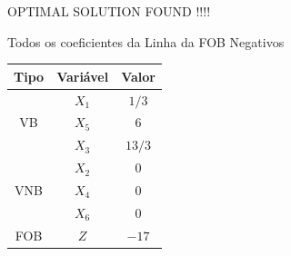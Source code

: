 \begin{frame}
{\begin{table}
\begin{tabular}{c c c c c c c c c c c c}
			\end{tabular}
		\end{table}
		{
			\begin{mdframed}[backgroundcolor=red!80]
				\centering
				OPTIMAL SOLUTION FOUND !!!!
			\end{mdframed}
			\vspace{0.2cm}
			\centering
			\Large
			Todos os coeficientes da Linha da FOB Negativos
		}
	}	
	{
		\begin{table}
			\begin{tabular}{ c | c | c |}
				\hline
				\cellcolor{blue!100} \color{white}\scriptsize Tipo     & 
				\cellcolor{blue!100} \color{white} \scriptsize Variável &  
				\cellcolor{blue!100} \color{white} \scriptsize Valor \\
				\hline
				\cellcolor{green!100} \multirow{3}{1cm}{VB}  & 
				\cellcolor{green!100} $\scriptstyle X_1$   &  
				\cellcolor{green!100} $\scriptstyle 1/3$   \\
				\cellcolor{green!100} VB & \cellcolor{green!100} $\scriptstyle X_5$   &  
				\cellcolor{green!100} $\scriptstyle 6$   \\
				\cellcolor{green!100} & \cellcolor{green!100} $\scriptstyle X_3$   &  
				\cellcolor{green!100} $\scriptstyle 13/3$   \\
				\multirow{3}{1cm}{ VNB} & $\scriptstyle X_2$   &  $\scriptstyle 0$   \\
										& $\scriptstyle X_4$   &  $\scriptstyle 0$   \\
										& $\scriptstyle X_6$   &  $\scriptstyle 0$ \\
				\cellcolor{green!100}FOB 				 & 
				\cellcolor{green!100} $\scriptstyle Z$     &  
				\cellcolor{green!100} $\scriptstyle -17$  \\
				\hline		
			\end{tabular}
		\end{table}
	}
\end{frame}

